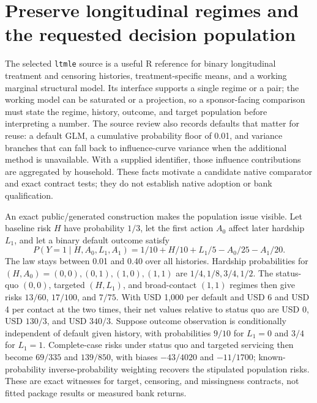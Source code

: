 \hypertarget{preserve-longitudinal-regimes-and-the-requested-decision-population}{%
\section{Preserve longitudinal regimes and the requested decision
population}\label{preserve-longitudinal-regimes-and-the-requested-decision-population}}

The selected \texttt{ltmle} source is a useful R reference for binary
longitudinal treatment and censoring histories, treatment-specific
means, and a working marginal structural model. Its interface supports a
single regime or a pair; the working model can be saturated or a
projection, so a sponsor-facing comparison must state the regime,
history, outcome, and target population before interpreting a number.
The source review also records defaults that matter for reuse: a default
GLM, a cumulative probability floor of 0.01, and variance branches that
can fall back to influence-curve variance when the additional method is
unavailable. With a supplied identifier, those influence contributions
are aggregated by household. These facts motivate a candidate native
comparator and exact contract tests; they do not establish native
adoption or bank qualification. \citep{exec23_ltmle_source}

An exact public/generated construction makes the population issue
visible. Let baseline risk \(H\) have probability \(1/3\), let the first
action \(A_0\) affect later hardship \(L_1\), and let a binary default
outcome satisfy \[
 P(Y=1\mid H,A_0,L_1,A_1)=1/10+H/10+L_1/5-A_0/25-A_1/20.
\] The law stays between 0.01 and 0.40 over all histories. Hardship
probabilities for \((H,A_0)=(0,0),(0,1),(1,0),(1,1)\) are
\(1/4,1/8,3/4,1/2\). The status-quo \((0,0)\), targeted \((H,L_1)\), and
broad-contact \((1,1)\) regimes then give risks \(13/60\), \(17/100\),
and \(7/75\). With USD 1,000 per default and USD 6 and USD 4 per contact
at the two times, their net values relative to status quo are USD 0, USD
\(130/3\), and USD \(340/3\). Suppose outcome observation is
conditionally independent of default given history, with probabilities
\(9/10\) for \(L_1=0\) and \(3/4\) for \(L_1=1\). Complete-case risks
under status quo and targeted servicing then become \(69/335\) and
\(139/850\), with biases \(-43/4020\) and \(-11/1700\);
known-probability inverse-probability weighting recovers the stipulated
population risks. These are exact witnesses for target, censoring, and
missingness contracts, not fitted package results or measured bank
returns. \citep{exec23_ltmle_exact}

